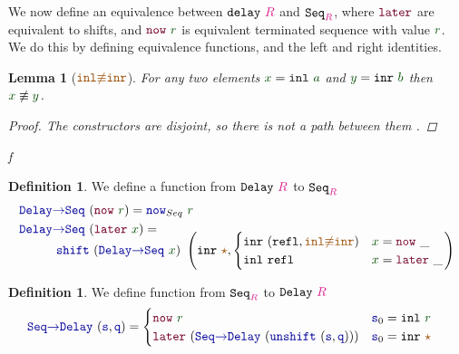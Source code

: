 \documentclass[twoside,11pt,openright]{report}
\theoremstyle{plain} %
\newtheorem{lem}[thm]{Lemma}
\theoremstyle{definition}
\newtheorem{defn}[thm]{Definition}%
\theoremstyle{remark}
\newcommand*{\term}[1]{\textcolor{green!30!black}{#1}} %
\newcommand*{\type}[1]{\textcolor{magenta!90!black}{#1}}
\newcommand*{\constant}[1]{\textcolor{orange!60!black}{\ensuremath{\mathtt{#1}}}}
\newcommand*{\function}[1]{\textcolor{blue!60!black}{\ensuremath{\mathtt{#1}}}}
\newcommand*{\constructor}[1]{\textcolor{purple!60!black}{\ensuremath{\mathtt{#1}}}}
\newcommand*{\typeformer}[1]{\ensuremath{\mathtt{#1}}}
\newcommand*{\unitelem}{\constant{\star}} %
\begin{document}
\noindent We now define an equivalence between \(\typeformer{delay}~\type{R}\) and \(\typeformer{Seq}_{\type{R}}\), where \(\constructor{later}\) are equivalent to shifts, and \(\constructor{now}~\term{r}\) is equivalent terminated sequence with value \(\term{r}\). We do this by defining equivalence functions, and the left and right identities.
\begin{lem}[\(\constant{inl{\not\equiv}inr}\)]
  For any two elements \(\term{x} = \mathtt{inl}~\term{a}\) and \(\term{y} = \mathtt{inr}~\term{b}\) then \(\term{x} \not\equiv \term{y}\).
  \begin{proof}
    The constructors are disjoint, so there is not a path between them .
  \end{proof}
f\end{lem}
\begin{defn}
  We define a function from \(\typeformer{Delay}~\type{R}\) to \(\typeformer{Seq}_{\type{R}}\)
  \begin{equation}
    \begin{aligned}
      \function{Delay{\rightarrow}Seq}&~(\constructor{now}~\term{r}) = \function{now}_{Seq}~\term{r} \\
      \function{Delay{\rightarrow}Seq}&~(\constructor{later}~\term{x}) = \\[-3mm]
      & \strut\hspace{-8mm}\function{shift}~(\function{Delay{\rightarrow}Seq}~\term{x})~\left(\mathtt{inr}~\unitelem , \begin{cases} \mathtt{inr}~(\mathtt{refl} , \constant{inl{\not\equiv}inr}) & \term{x} = \constructor{now}~\_ \\ \mathtt{inl}~\mathtt{refl} & \term{x} = \constructor{later}~\_ \end{cases}\right)
    \end{aligned}
  \end{equation}
\end{defn}
\begin{defn}
  We define function from \(\typeformer{Seq}_{\type{R}}\) to \(\typeformer{Delay}~\type{R}\)
    \begin{equation}
      \begin{aligned}
        \function{Seq{\rightarrow}Delay}&~(\function{s} , \function{q}) = \begin{cases} \constructor{now}~\term{r} & \function{s}_0 = \mathtt{inl}~\term{r} \\ \constructor{later}~(\function{Seq{\rightarrow}Delay}~(\function{unshift}~(\function{s} , \function{q}))) & \function{s}_0 = \mathtt{inr}~\unitelem \end{cases}
      \end{aligned}
    \end{equation}
\end{defn}
\end{document}
